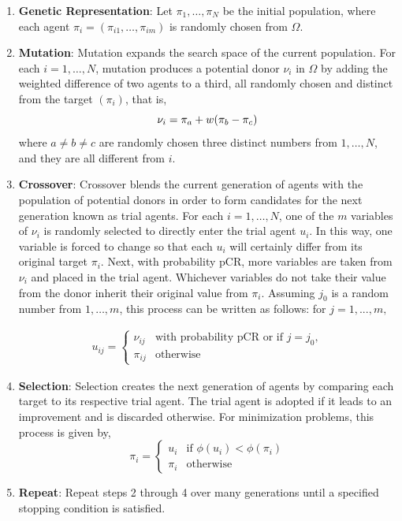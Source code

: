 \documentclass [PhD] {package/uclathes}
\begin{document}
\begin{enumerate}
    \item \textbf{Genetic Representation}:
    Let {$\pi_1, \ldots ,\pi_N$ } be the initial population, where each agent
    $\pi_i = (\pi_{i1},\dots,\pi_{im})$ is randomly chosen from $\Omega$.

    \item \textbf{Mutation}:
    Mutation expands the search space of the current population.
    For each $i = 1, \ldots , N$, mutation produces a potential donor $\nu_i$
    in $\Omega$ by adding the weighted difference of two agents to a third,
    all randomly chosen and distinct from the target $(\pi_i)$, that is,
    \begin{equation}
        \nu_i = \pi_a + w(\pi_b - \pi_c)\\
        \label{mutation}
    \end{equation}
    where $a \neq b \neq c$ are randomly chosen three distinct numbers from
    $1,\dots, N$, and they are all different from $i$.

    \item \textbf{Crossover}:
    Crossover blends the current generation of agents with the population of
    potential donors in order to form candidates for the next generation known
    as trial agents. For each $i = 1,\dots, N$, one of the $m$ variables of
    $\nu_i$ is randomly selected to directly enter the trial agent $u_i$.
    In this way, one variable is forced to change so that each $u_i$ will
    certainly differ from its original target $\pi_i$. Next, with probability pCR, more variables are taken from $\nu_i$ and placed in the trial
    agent. Whichever variables do not take their value from the donor inherit
    their original value from $\pi_i$. Assuming $j_0$ is a random number from
    $1, \dots , m$, this process can be written as follows: for
    $j = 1, . . . , m,$

    $$
    \begin{aligned}
    u_{ij} = \begin{cases} \nu_{ij}& \text{with probability pCR}
    \text{ or if } j= j_0,\\ \pi_{ij}& \text{otherwise}    \end{cases}
    \end{aligned}
    $$

    \item \textbf{Selection}:
    Selection creates the next generation of agents by comparing each target
    to its respective trial agent. The trial agent is adopted if it leads
    to an improvement and is discarded otherwise. For minimization problems,
    this process is given by,
    $$
    \pi_i =  \begin{cases} u_i & \text{if } \phi(u_i) < \phi(\pi_i)\\
        \pi_i &\text{otherwise}  \end{cases}
    $$
    \item \textbf{Repeat}:
    Repeat steps 2 through 4 over many generations until a specified
    stopping condition is satisfied.
\end{enumerate}
\end{document}
